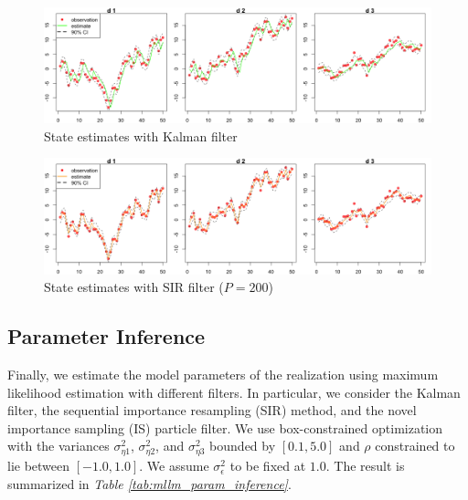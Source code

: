 \documentclass[11pt, oneside]{scrreprt}   	%
\begin{document}
\begin{figure}[h!]
\centering
\includegraphics[width=155mm]{../../images/mllm-estimate-kalman.png}
\caption{State estimates with Kalman filter}
\label{fig:mllm_estimate_kalman}
\end{figure}

\begin{figure}[h!]
\centering
\includegraphics[width=155mm]{../../images/mllm-estimate-sir.png}
\caption{State estimates with SIR filter ($P=200$)}
\label{fig:mllm_estimate_sir}
\end{figure}

\subsection{Parameter Inference}
Finally, we estimate the model parameters of the realization using maximum likelihood estimation with different filters. In particular, we consider the Kalman filter, the sequential importance resampling (SIR) method, and the novel importance sampling (IS) particle filter. We use box-constrained optimization with the variances $\sigma_{\eta 1}^2$,  $\sigma_{\eta 2}^2$, and $\sigma_{\eta 3}^2$ bounded by $[0.1,5.0]$ and  $\rho$ constrained to lie between $[-1.0, 1.0]$. We assume $\sigma_{\epsilon}^2$ to be fixed at $1.0$. The result is summarized in \textit{Table \ref{tab:mllm_param_inference}}.\\  
\end{document}
